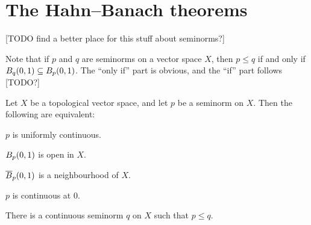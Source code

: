 \documentclass[article, a4paper, 11pt, oneside]{memoir}
\numberwithin{equation}{chapter}
\begin{document}
\section{The Hahn--Banach theorems}

[TODO find a better place for this stuff about seminorms?]

Note that if $p$ and $q$ are seminorms on a vector space $X$, then $p \leq q$ if and only if $\ball[q]{0}{1} \subseteq \ball[p]{0}{1}$. The \enquote{only if} part is obvious, and the \enquote{if} part follows [TODO?]


\begin{proposition}
    Let $X$ be a topological vector space, and let $p$ be a seminorm on $X$. Then the following are equivalent:
    \begin{enumprop}
        \item \label{enum:seminorm-uniformly-continuous} $p$ is uniformly continuous.
        \item \label{enum:seminorm-open-ball} $\ball[p]{0}{1}$ is open in $X$.
        \item \label{enum:seminorm-closed-ball} $\cball[p]{0}{1}$ is a neighbourhood of $X$.
        \item \label{enum:seminorm-continuous-at-0} $p$ is continuous at $0$.
        \item \label{enum:seminorm-continuity-domination} There is a continuous seminorm $q$ on $X$ such that $p \leq q$.
    \end{enumprop}
\end{proposition}
\end{document}

